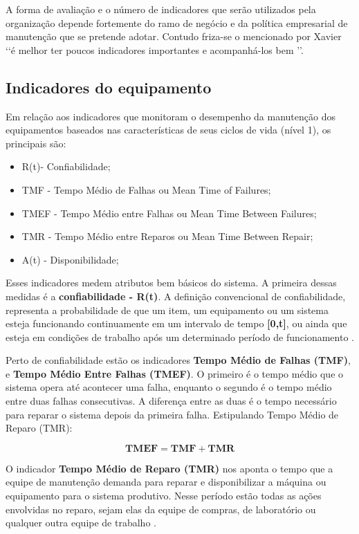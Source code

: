 A forma de avaliação e o número de indicadores que serão utilizados pela organização depende fortemente do ramo de negócio e da política empresarial de manutenção que se pretende adotar. Contudo friza-se o mencionado por Xavier \cite{xavier2007indicadores} \lq\lq é melhor ter poucos indicadores importantes e acompanhá-los bem \rq\rq.

\subsection{Indicadores do equipamento}
\label{nivel 1}

Em relação aos indicadores que monitoram o desempenho da manutenção dos equipamentos baseados nas características de seus ciclos de vida (nível 1), os principais são:

\begin{itemize}
	\item R(t)- Confiabilidade;
	\item TMF - Tempo Médio de Falhas ou Mean Time of Failures;
	\item TMEF - Tempo Médio entre Falhas ou Mean Time Between Failures;
	\item TMR - Tempo Médio entre Reparos ou Mean Time Between Repair;
	\item A(t) - Disponibilidade;
	\end{itemize}

Esses indicadores medem atributos bem básicos do sistema. A primeira dessas medidas é a \textbf{confiabilidade - R(t)}. A definição convencional de confiabilidade, representa a probabilidade de que um item, um equipamento ou um sistema esteja funcionando continuamente em um intervalo de tempo \textbf{[0,t]}, ou ainda que esteja em condições de trabalho após um determinado período de funcionamento \cite{tavares1999administraccao}. 

Perto de confiabilidade estão os indicadores \textbf{Tempo Médio de Falhas (TMF)},  e \textbf{Tempo Médio Entre Falhas (TMEF)}. O primeiro é o tempo médio que o sistema opera até acontecer uma falha, enquanto o segundo é o tempo médio entre duas falhas consecutivas. A diferença entre as duas  é o tempo necessário para reparar o sistema depois da primeira falha. Estipulando Tempo Médio de Reparo (TMR):

\begin{equation}
\label{eqn01}
	\mathbf{TMEF} = \mathbf{TMF} + \mathbf{TMR} 
\end{equation}

O indicador \textbf{Tempo Médio de Reparo (TMR)} nos aponta o tempo que a equipe de manutenção demanda para reparar e disponibilizar a máquina ou equipamento para o sistema produtivo. Nesse período estão todas as ações envolvidas no reparo, sejam elas da equipe de compras, de laboratório ou qualquer outra equipe de trabalho \cite{ZEN2008}.

